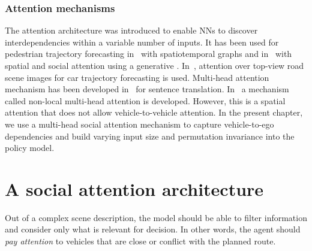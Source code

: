\subsubsection{Attention mechanisms} 

The attention architecture was introduced to enable \glspl*{NN}  to discover interdepen\-dencies within a variable number of inputs.
It has been used for pedestrian trajectory forecasting in~\citep{Vemula2018} with spatiotemporal graphs and in~\citep{Sadeghian2019CVPR} with spatial and social attention using a generative . In~\citep{Sadeghian2018ECCV}, attention over top-view road scene images for car trajectory forecasting is used. Multi-head attention mechanism has been developed in~\citep{Vaswani2017} for sentence translation. In~\citep{Messaoud2019} a mechanism called non-local multi-head attention is developed. However, this is a spatial attention that does not allow vehicle-to-vehicle attention. In the present chapter, we use a multi-head social attention mechanism to capture vehicle-to-ego dependencies and build varying input size and permutation invariance into the policy model.

\section{A social attention architecture}
\label{sec:architecture}

Out of a complex scene description, the model should be able to filter information and consider only what is relevant for decision. In other words, the agent should \emph{pay attention} to vehicles that are close or conflict with the planned route.

